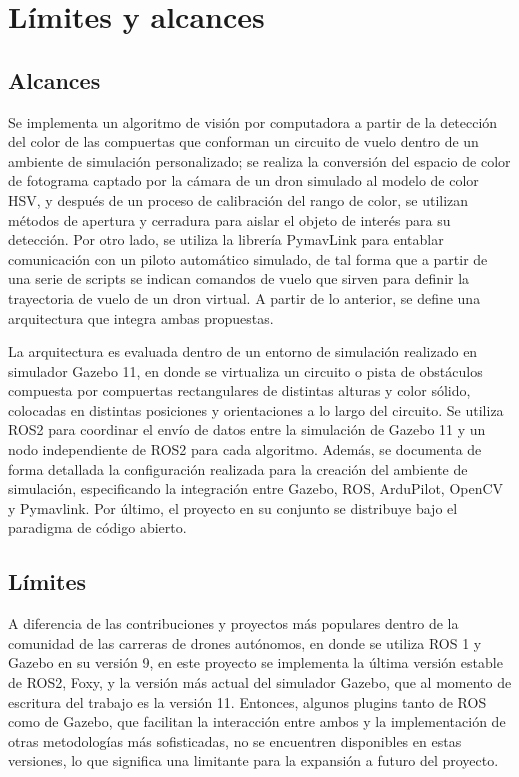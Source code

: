 \section{Límites y alcances}

\subsection{Alcances}
Se implementa un algoritmo de visión por computadora a partir de la detección del color de las compuertas que conforman un circuito de vuelo dentro de un ambiente de simulación personalizado; se realiza la conversión del espacio de color de fotograma captado por la cámara de un dron simulado al modelo de color HSV, y después de un proceso de calibración del rango de color, se utilizan métodos de apertura y cerradura para aislar el objeto de interés para su detección. Por otro lado, se utiliza la librería PymavLink para entablar comunicación con un piloto automático simulado, de tal forma que a partir de una serie de scripts se indican comandos de vuelo que sirven para definir la trayectoria de vuelo de un dron virtual. A partir de lo anterior, se define una arquitectura que integra ambas propuestas.  

La arquitectura es evaluada dentro de un entorno de simulación realizado en simulador Gazebo 11, en donde se virtualiza un circuito o pista de obstáculos compuesta por compuertas rectangulares de distintas alturas y color sólido, colocadas en distintas posiciones y orientaciones a lo largo del circuito. Se utiliza ROS2 para coordinar el envío de datos entre la simulación de Gazebo 11 y un nodo independiente de ROS2 para cada algoritmo. Además, se documenta de forma detallada la configuración realizada para la creación del ambiente de simulación, especificando la integración entre Gazebo, ROS, ArduPilot, OpenCV y Pymavlink. Por último, el proyecto en su conjunto se distribuye bajo el paradigma de código abierto.

\subsection{Límites}
A diferencia de las contribuciones y proyectos más populares dentro de la comunidad de las carreras de drones autónomos, en donde se utiliza ROS 1 y Gazebo en su versión 9, en este proyecto se implementa la última versión estable de ROS2, Foxy, y la versión más actual del simulador Gazebo, que al momento de escritura del trabajo es la versión 11. Entonces, algunos plugins tanto de ROS como de Gazebo, que facilitan la interacción entre ambos y la implementación de otras metodologías más sofisticadas, no se encuentren disponibles en estas versiones, lo que significa una limitante para la expansión a futuro del proyecto. 

